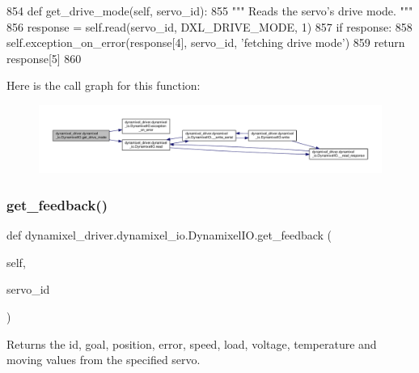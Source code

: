 \begin{DoxyCode}
854     \textcolor{keyword}{def }get\_drive\_mode(self, servo\_id):
855         \textcolor{stringliteral}{""" Reads the servo's drive mode. """}
856         response = self.read(servo\_id, DXL\_DRIVE\_MODE, 1)
857         \textcolor{keywordflow}{if} response:
858             self.exception\_on\_error(response[4], servo\_id, \textcolor{stringliteral}{'fetching drive mode'})
859         \textcolor{keywordflow}{return} response[5]
860 
\end{DoxyCode}
Here is the call graph for this function\+:
\nopagebreak
\begin{figure}[H]
\begin{center}
\leavevmode
\includegraphics[width=350pt]{dd/d77/classdynamixel__driver_1_1dynamixel__io_1_1_dynamixel_i_o_ad81c7f3da8654306f00f7ad9a2cbf54c_cgraph}
\end{center}
\end{figure}
\mbox{\label{classdynamixel__driver_1_1dynamixel__io_1_1_dynamixel_i_o_a91841058e6c53561236ab08762438d52}} 
\subsubsection{\texorpdfstring{get\+\_\+feedback()}{get\_feedback()}}
{\footnotesize\ttfamily def dynamixel\+\_\+driver.\+dynamixel\+\_\+io.\+Dynamixel\+I\+O.\+get\+\_\+feedback (\begin{DoxyParamCaption}\item[{}]{self,  }\item[{}]{servo\+\_\+id }\end{DoxyParamCaption})}

\begin{DoxyVerb}Returns the id, goal, position, error, speed, load, voltage, temperature
and moving values from the specified servo.
\end{DoxyVerb}
 

